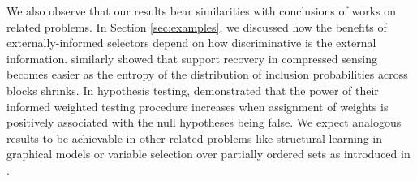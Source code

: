 \documentclass[aos]{imsart}
\theoremstyle{plain}
\begin{document}
We also observe that our results bear similarities with conclusions of works on related problems. In Section \ref{sec:examples}, we discussed how the benefits of externally-informed selectors depend on how discriminative is the external information. \cite{scarlett2012compressed} similarly showed that support recovery in compressed sensing becomes easier as the entropy of the distribution of inclusion probabilities across blocks shrinks. In hypothesis testing, \cite{genovese2006} demonstrated that the power of their informed weighted testing procedure increases when assignment of weights is positively associated with the null hypotheses being false. We expect analogous results to be achievable in other related problems like structural learning in graphical models or variable selection over partially ordered sets as introduced in \cite{taeb}. 


%
%

%
\end{document}
